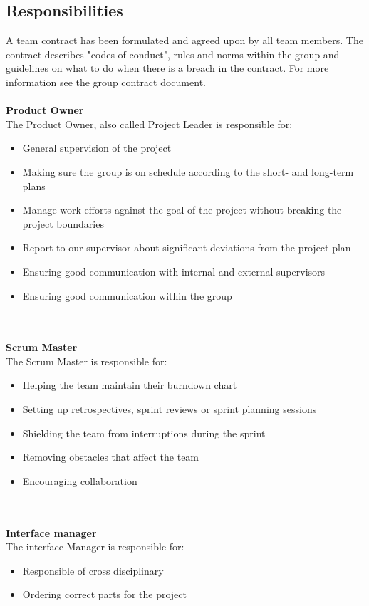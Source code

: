 \subsection{Responsibilities}

A team contract has been formulated and agreed upon by all team members. The contract describes "codes of conduct", rules and norms within the group and guidelines on what to do when there is a breach in the contract. For more information see the group contract document. 
\\\\
\textbf{Product Owner}\\
The Product Owner, also called Project Leader is responsible for: 
\begin{itemize}
  \item General supervision of the project
  \item Making sure the group is on schedule according to the short- and long-term plans
  \item Manage work efforts against the goal of the project without breaking the project boundaries 
  \item Report to our supervisor about significant deviations from the project plan
  \item Ensuring good communication with internal and external supervisors
  \item Ensuring good communication within the group
\end{itemize}
\\\\
\textbf{Scrum Master}\\
The Scrum Master is responsible for: 
\begin{itemize}
  \item Helping the team maintain their burndown chart
  \item Setting up retrospectives, sprint reviews or sprint planning sessions
  \item Shielding the team from interruptions during the sprint
  \item Removing obstacles that affect the team
  \item Encouraging collaboration
\end{itemize}
\\\\
\textbf{Interface manager}\\
The interface Manager is responsible for:
\begin{itemize}
  \item Responsible of cross disciplinary
  \item Ordering correct parts for the project
\end{itemize}
